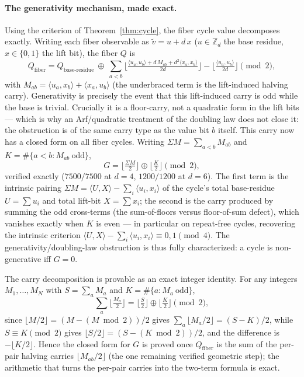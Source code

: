 \documentclass[11pt]{article}
\theoremstyle{remark}
\newcommand{\Z}{\mathbb{Z}}
\newcommand{\ip}[2]{\langle #1,#2\rangle}
\begin{document}
\paragraph{The generativity mechanism, made exact.}
Using the criterion of Theorem~\ref{thm:cycle}, the fiber cycle value decomposes exactly. Writing each
fiber observable as $\tilde v=u+d\,x$ ($u\in\Z_d$ the base residue, $x\in\{0,1\}$ the lift bit), the
fiber $Q$ is
\[
Q_{\mathrm{fiber}}=Q_{\text{base-residue}}\ \oplus\ \sum_{a<b}\Big\lfloor
\tfrac{\ip{u_a}{u_b}+d\,M_{ab}+d^2\ip{x_a}{x_b}}{2d}\Big\rfloor-\Big\lfloor\tfrac{\ip{u_a}{u_b}}{2d}
\Big\rfloor\pmod 2,
\]
with $M_{ab}=\ip{u_a}{x_b}+\ip{x_a}{u_b}$ (the underbraced term is the lift-induced halving carry).
Generativity is precisely the event that this lift-induced carry is odd while the base is trivial.
Crucially it is a floor-carry, not a quadratic form in the lift bits --- which is why an Arf/quadratic
treatment of the doubling law does not close it: the obstruction is of the same carry type as the
value bit $b$ itself. This carry now has a closed form on all fiber cycles. Writing
$\Sigma M=\sum_{a<b}M_{ab}$ and $K=\#\{a<b:M_{ab}\ \text{odd}\}$,
\[
G=\big\lfloor\tfrac{\Sigma M}{2}\big\rfloor\oplus\big\lfloor\tfrac{K}{2}\big\rfloor\pmod 2,
\]
verified exactly ($7500/7500$ at $d=4$, $1200/1200$ at $d=6$). The first term is the intrinsic pairing
$\Sigma M=\ip{U}{X}-\sum_i\ip{u_i}{x_i}$ of the cycle's total base-residue $U=\sum u_i$ and total
lift-bit $X=\sum x_i$; the second is the carry produced by summing the odd cross-terms (the
sum-of-floors versus floor-of-sum defect), which vanishes exactly when $K$ is even --- in particular
on repeat-free cycles, recovering the intrinsic criterion $\ip{U}{X}-\sum_i\ip{u_i}{x_i}\equiv 0,1
\pmod 4$. The generativity/doubling-law obstruction is thus fully characterized: a cycle is
non-generative iff $G=0$.

The carry decomposition is provable as an exact integer identity. For any integers
$M_1,\dots,M_N$ with $S=\sum_a M_a$ and $K=\#\{a:M_a\ \text{odd}\}$,
\[
\sum_a\big\lfloor\tfrac{M_a}{2}\big\rfloor=\big\lfloor\tfrac{S}{2}\big\rfloor\oplus
\big\lfloor\tfrac{K}{2}\big\rfloor\pmod 2,
\]
since $\lfloor M/2\rfloor=(M-(M\bmod 2))/2$ gives $\sum_a\lfloor M_a/2\rfloor=(S-K)/2$, while
$S\equiv K\pmod 2$ gives $\lfloor S/2\rfloor=(S-(K\bmod 2))/2$, and the difference is
$-\lfloor K/2\rfloor$. Hence the closed form for $G$ is proved once $Q_{\mathrm{fiber}}$ is the sum of
the per-pair halving carries $\lfloor M_{ab}/2\rfloor$ (the one remaining verified geometric step); the
arithmetic that turns the per-pair carries into the two-term formula is exact.
\end{document}
